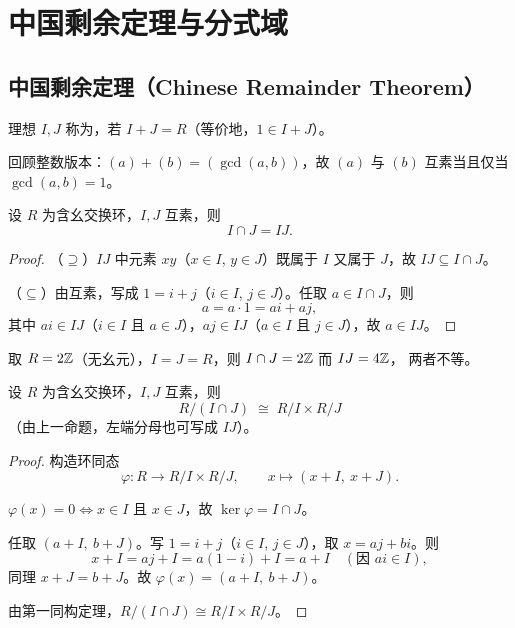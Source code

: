 \section{中国剩余定理与分式域}\label{sec:crt-frac}

\subsection{中国剩余定理（Chinese Remainder Theorem）}

\begin{definition}[互素理想]
理想 $I, J$ 称为，若 $I + J = R$（等价地，$1\in I + J$）。
\end{definition}

回顾整数版本：$(a) + (b) = (\gcd(a,b))$，故 $(a)$ 与 $(b)$ 互素当且仅当
$\gcd(a,b) = 1$。

\begin{proposition}
设 $R$ 为含幺交换环，$I, J$ 互素，则
\[
  I\cap J = IJ.
\]
\end{proposition}

\begin{proof}
（$\supseteq$）$IJ$ 中元素 $xy$（$x\in I$, $y\in J$）既属于 $I$ 又属于
$J$，故 $IJ\subseteq I\cap J$。

（$\subseteq$）由互素，写成 $1 = i + j$（$i\in I$, $j\in J$）。任取
$a\in I\cap J$，则
\[
  a = a\cdot 1 = ai + aj,
\]
其中 $ai\in IJ$（$i\in I$ 且 $a\in J$），$aj\in IJ$（$a\in I$ 且
$j\in J$），故 $a\in IJ$。
\end{proof}

\begin{example}[无幺元时命题不成立]
取 $R = 2\mathbb{Z}$（无幺元），$I = J = R$，则 $I\cap J = 2\mathbb{Z}$ 而 $IJ = 4\mathbb{Z}$，
两者不等。
\end{example}

\begin{theorem}
设 $R$ 为含幺交换环，$I, J$ 互素，则
\[
  R/(I\cap J) \;\cong\; R/I\times R/J
\]
（由上一命题，左端分母也可写成 $IJ$）。
\end{theorem}

\begin{proof}
构造环同态
\[
  \varphi\colon R\longrightarrow R/I\times R/J, \qquad
  x\mapsto (x + I,\ x + J).
\]

$\varphi(x) = 0 \iff x\in I$ 且 $x\in J$，故
$\ker\varphi = I\cap J$。

任取 $(a + I,\ b + J)$。写 $1 = i + j$（$i\in I$,
$j\in J$），取 $x = aj + bi$。则
\[
  x + I = aj + I = a(1-i) + I = a + I \quad(\text{因 }ai\in I),
\]
同理 $x + J = b + J$。故 $\varphi(x) = (a+I,\ b+J)$。

由第一同构定理，$R/(I\cap J)\cong R/I\times R/J$。
\end{proof}

